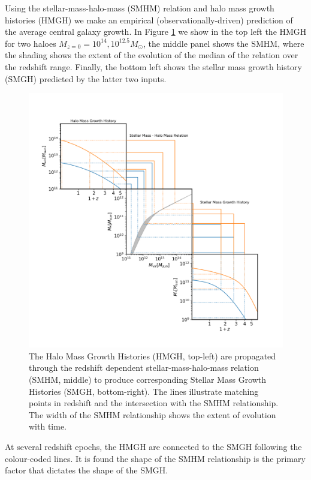 Using the stellar-mass-halo-mass (SMHM) relation and halo mass growth histories (HMGH) we make an empirical (observationally-driven) prediction of the average central galaxy growth. In Figure \ref{fig:Cent_Mass_PP} we show in the top left the HMGH for two haloes $M_{z=0} = 10^{14}, 10^{12.5} M_{\odot}$, the middle panel shows the SMHM, where the shading shows the extent of the evolution of the median of the relation over the redshift range. Finally, the bottom left shows the stellar mass growth history (SMGH) predicted by the latter two inputs.

\begin{figure}[h]
    \centering
    \includegraphics[width = \linewidth]{Figures/Chapter2/HMGH_to_SMGH.png}
    \caption{The Halo Mass Growth Histories (HMGH, top-left) are propagated through the redshift dependent stellar-mass-halo-mass relation (SMHM, middle) to produce corresponding Stellar Mass Growth Histories (SMGH, bottom-right). The lines illustrate matching points in redshift and the intersection with the SMHM relationship. The width of the SMHM relationship shows the extent of evolution with time.}
    \label{fig:Cent_Mass_PP}
\end{figure}

At several redshift epochs, the HMGH are connected to the SMGH following the colour-coded lines. It is found the shape of the SMHM relationship is the primary factor that dictates the shape of the SMGH. 


